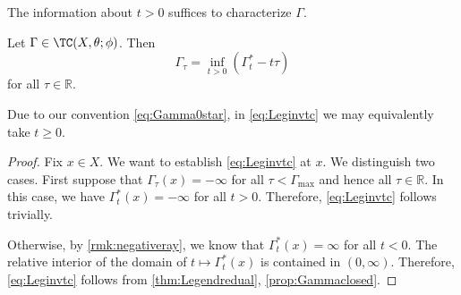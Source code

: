 The information about $t>0$ suffices to characterize $\Gamma$.
\begin{proposition}\label{prop:Leginvtc}
    Let $\Gamma\in \TC(X,\theta;\phi)$. Then
    \begin{equation}\label{eq:Leginvtc}
    \Gamma_{\tau}=\inf_{t>0} \left(\Gamma^*_t-t\tau\right)
    \end{equation}
    for all $\tau\in \mathbb{R}$.
\end{proposition}
Due to our convention \eqref{eq:Gamma0star}, in \eqref{eq:Leginvtc} we may equivalently take $t\geq 0$.
\begin{proof}
    Fix $x\in X$. We want to establish \eqref{eq:Leginvtc} at $x$.
    We distinguish two cases. First suppose that $\Gamma_{\tau}(x)=-\infty$ for all $\tau<\Gamma_{\max}$ and hence all $\tau\in \mathbb{R}$. In this case, we have $\Gamma_t^*(x)=-\infty$ for all $t>0$. Therefore, \eqref{eq:Leginvtc} follows trivially.

    Otherwise, by \cref{rmk:negativeray}, we know that $\Gamma^*_t(x)=\infty$ for all $t<0$. The relative interior of the domain of $t\mapsto \Gamma^*_t(x)$ is contained in $(0,\infty)$.
    Therefore, \eqref{eq:Leginvtc} follows from \cref{thm:Legendredual}, \cref{prop:Gammaclosed}.
\end{proof}

